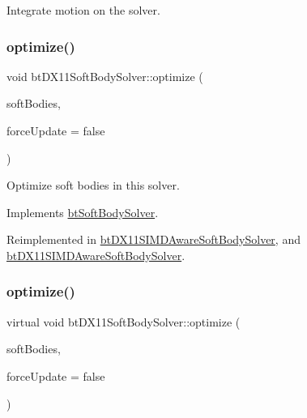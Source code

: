 Integrate motion on the solver. \mbox{\label{classbtDX11SoftBodySolver_a1d181b7e59619553241ac463db54c490}} 
\subsubsection{\texorpdfstring{optimize()}{optimize()}\hspace{0.1cm}{\footnotesize\ttfamily [1/2]}}
{\footnotesize\ttfamily void bt\+D\+X11\+Soft\+Body\+Solver\+::optimize (\begin{DoxyParamCaption}\item[{\hyperlink{classbtAlignedObjectArray}{bt\+Aligned\+Object\+Array}$<$ \hyperlink{classbtSoftBody}{bt\+Soft\+Body} $\ast$ $>$ \&}]{soft\+Bodies,  }\item[{bool}]{force\+Update = {\ttfamily false} }\end{DoxyParamCaption})\hspace{0.3cm}{\ttfamily [virtual]}}

Optimize soft bodies in this solver. 

Implements \hyperlink{classbtSoftBodySolver_af07da1ec6f11e7873bc5fafef426fcd3}{bt\+Soft\+Body\+Solver}.



Reimplemented in \hyperlink{classbtDX11SIMDAwareSoftBodySolver_a575cf63485ef6a9a55f045e13dcb7717}{bt\+D\+X11\+S\+I\+M\+D\+Aware\+Soft\+Body\+Solver}, and \hyperlink{classbtDX11SIMDAwareSoftBodySolver_a438ad9c2749189a20c5c950023893f76}{bt\+D\+X11\+S\+I\+M\+D\+Aware\+Soft\+Body\+Solver}.

\mbox{\label{classbtDX11SoftBodySolver_a59eaf00da6dcf9c6fc25bdb4cff2718a}} 
\subsubsection{\texorpdfstring{optimize()}{optimize()}\hspace{0.1cm}{\footnotesize\ttfamily [2/2]}}
{\footnotesize\ttfamily virtual void bt\+D\+X11\+Soft\+Body\+Solver\+::optimize (\begin{DoxyParamCaption}\item[{\hyperlink{classbtAlignedObjectArray}{bt\+Aligned\+Object\+Array}$<$ \hyperlink{classbtSoftBody}{bt\+Soft\+Body} $\ast$ $>$ \&}]{soft\+Bodies,  }\item[{bool}]{force\+Update = {\ttfamily false} }\end{DoxyParamCaption})\hspace{0.3cm}{\ttfamily [virtual]}}

